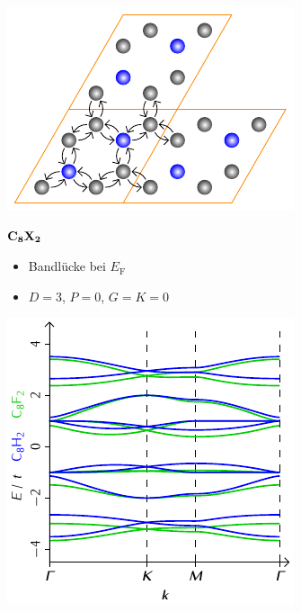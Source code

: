 \documentclass{beamer}
\newcommand \inlinetitle[1]{\begin{center} \color{MidnightBlue} \bf \Large #1 \end{center}}
\begin{document}
	\begin{frame}
		\begin{minipage}[b][0.48\textwidth][c]{0.48\textwidth}
			\includegraphics[width=\textwidth]{Abbildungen/Raumstrukturen/C8X2.pdf}
		\end{minipage}
		\hfill
		\begin{minipage}[b][0.48\textwidth][c]{0.48\textwidth}
			\inlinetitle{$\bf C_{\boldsymbol 8}X_{\boldsymbol 2}$}
			\begin{itemize}
				\item Bandlücke bei $E_\text{F}$
				\item $D = 3$, $P = 0$, $G = K = 0$
			\end{itemize}
		\end{minipage}
		\begin{minipage}{0.48\textwidth}
			\includegraphics[width=\textwidth]{Abbildungen/Bandstrukturen/C8X2.pdf}

\end{minipage}
\end{frame}
\end{document}
